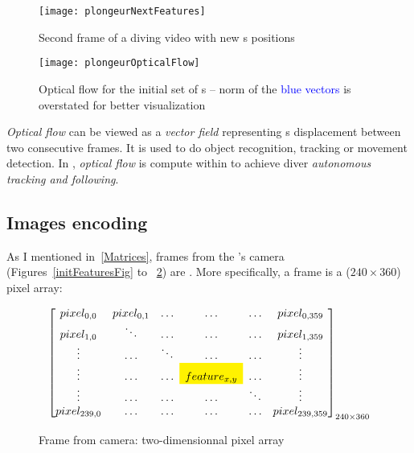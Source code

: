 \begin{figure}[!htbp]
	\centering
	\texttt{[image: plongeurNextFeatures]}
	\caption{Second frame of a diving video with new \feat{}s positions}
	\label{secondFeaturesFig}
\end{figure}
\FloatBarrier



\begin{figure}[!htbp]
	\centering
	\texttt{[image: plongeurOpticalFlow]}
	\caption{Optical flow for the initial set of \feat{}s -- \small{norm of the \textcolor{blue}{blue vectors} is overstated for better visualization}}
	\label{opticalFlowFig}
\end{figure}
\FloatBarrier

\emph{Optical flow} can be viewed as a \emph{vector field} representing \feat{}s displacement between two consecutive frames. It is used to do object recognition, tracking or movement detection. In \iBubble, \emph{optical flow} is compute within  to achieve diver \emph{autonomous tracking and following}.\par


\subsection{Images encoding}

As I mentioned in~\ref{Matrices}, frames from the \rasp's camera (Figures~\ref{initFeaturesFig} to ~\ref{opticalFlowFig}) are . More specifically, a frame is a ($240\times 360$) pixel array:

\begin{figure}[!htbp]
\[
\begin{bmatrix}

pixel_{0,0} & pixel_{0,1} & \ldots & \ldots & \ldots & pixel_{0,359}\\

pixel_{1,0} & \ddots & \ldots & \ldots & \ldots & pixel_{1,359}\\

\vdots & \ldots & \ddots & \ldots & \ldots & \vdots\\

\vdots & \ldots & \ldots & \cellcolor{yellow}{feature_{x,y}} & \ldots & \vdots\\

\vdots & \ldots & \ldots & \ldots & \ddots & \vdots\\

pixel_{239,0} & \ldots & \ldots  & \ldots & \ldots & pixel_{239,359}

\end{bmatrix}_{240\times 360}
\]
\caption{Frame from camera: two-dimensionnal pixel array}
\label{frameFig}
\end{figure}
\FloatBarrier

